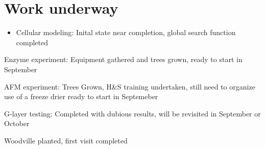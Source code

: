 \section{Work underway}
\begin{itemize}
\item Cellular modeling:
Inital state near completion, global search function completed
\end{itemize}
Enzyme experiment: 
Equipment gathered and trees grown, ready to start in September

AFM experiment:
Trees Grown, H&S training undertaken, still need to organize use of a freeze drier
ready to start in Septemeber

G-layer testing:
Completed with dubious results, will be revisited in September or October

Woodville planted, first visit completed

  
  
  
  
